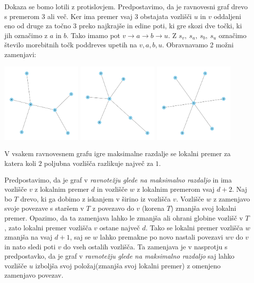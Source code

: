 \documentclass[fin1, tisk]{fmfdelo}
\begin{document}
\begin{dokaz}
Dokaza se bomo lotili z protislovjem. Predpostavimo, da je ravnovesni graf
drevo s premerom 3 ali več. Ker ima premer vsaj 3 obstajata vozlišči
$u$ in $v$ oddaljeni eno od druge za točno 3 preko najkrajše in edine poti,
ki gre skozi dve točki, ki jih označimo z $a$ in $b$. Tako imamo pot
$v \to a \to b \to u$. Z $s_v,\ s_a,\ s_b,\ s_u$ označimo število morebitnih
točk poddreves upetih na $v, a, b, u$. Obravnavamo 2 možni zamenjavi: 
\end{dokaz}

\includegraphics[width=0.3\textwidth]{drevo_1.png}
\includegraphics[width=0.3\textwidth]{drevo_2.png}
\includegraphics[width=0.3\textwidth]{drevo_3.png}


\begin{lema}
V vsakem ravnovesnem grafu igre maksimalne razdalje se lokalni premer za
katera koli $2$ poljubna vozlišča razlikuje največ za $1$.
\end{lema}

\begin{dokaz}
Predpostavimo, da je graf v \textit{ravnotežju glede na maksimalno razdaljo} in ima vozlišče $v$ z lokalnim premer $d$ in vozlišče
$w$ z lokalnim premerom vsaj $d+2$. Naj bo $T$ drevo, ki ga dobimo z iskanjem v širino
iz vozlišča $v$. Vozlišče $w$ z zamenjavo svoje povezave s staršem v $T$ z povezavo do
$v$ (korena $T$) zmanjša svoj lokalni premer. Opazimo, da ta zamenjava lahko le zmanjša ali ohrani globine vozlišč v $T$,
zato lokalni premer vozlišča $v$ ostane največ $d$. Tako se lokalni premer
vozlišča $w$ zmanjša na vsaj $d+1$, saj se $w$ lahko premakne po novo nastali povezavi $wv$ do
$v$ in nato sledi poti $v$ do vseh ostalih vozlišča. Ta zamenjava
je v nasprotju s predpostavko, da je graf v \textit{ravnotežju glede na maksimalno razdaljo} saj lahko vozlišče $u$
izboljša svoj položaj(zmanjša svoj lokalni premer) z omenjeno zamenjavo povezav.
\end{dokaz}
\end{document}
